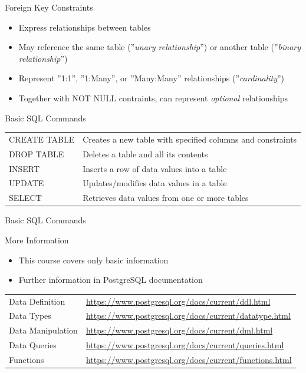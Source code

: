 \documentclass[ignorenonframetext,xcolor=x11names]{beamer}
\begin{document}
\begin{frame}{Foreign Key Constraints}
\begin{itemize}
	\item Express relationships between tables
	\item May reference the same table (''\emph{unary relationship}'') or another table (''\emph{binary relationship}'')
	\item Represent ''1:1'', ''1:Many'', or ''Many:Many'' relationships (''\emph{cardinality}'')
	\item Together with NOT NULL contraints, can represent \emph{optional} relationships
\end{itemize}
\end{frame}

\begin{frame}{Basic SQL Commands}
\renewcommand{\arraystretch}{1.5}

\begin{tabularx}{\textwidth}{l|X} \hline
CREATE TABLE & Creates a new table with specified columns and constraints \\
DROP TABLE & Deletes a table and all its contents \\
INSERT & Inserts a row of data values into a table \\
UPDATE & Updates/modifies data values in a table \\ 
SELECT & Retrieves data values from one or more tables \\ \hline
\end{tabularx}
\end{frame}

\begin{frame}{Basic SQL Commands}
\begin{block}{More Information}
  \begin{itemize}
    \item This course covers only basic information
    \item Further information in PostgreSQL documentation
  \end{itemize}
\end{block}
\vspace{3mm}
\renewcommand{\arraystretch}{1.5}
\small
\begin{tabularx}{\textwidth}{l|X} \hline
  Data Definition & \url{https://www.postgresql.org/docs/current/ddl.html} \\
  Data Types & \url{https://www.postgresql.org/docs/current/datatype.html} \\
  Data Manipulation & \url{https://www.postgresql.org/docs/current/dml.html} \\
  Data Queries & \url{https://www.postgresql.org/docs/current/queries.html} \\
  Functions & \url{https://www.postgresql.org/docs/current/functions.html} \\ \hline
\end{tabularx}
\end{frame}
\end{document}
